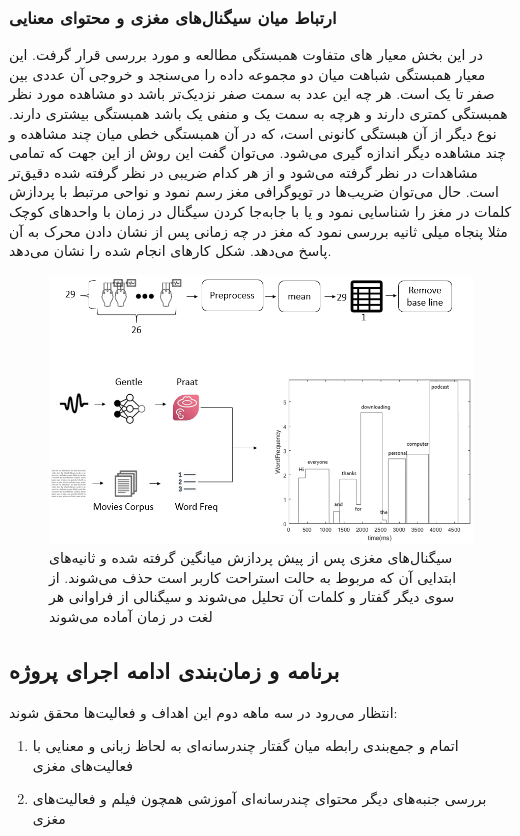 \subsubsection{ارتباط میان سیگنال‌های مغزی و محتوای معنایی}
در این بخش معیار های متفاوت همبستگی
مطالعه و مورد بررسی قرار گرفت. این معیار همبستگی شباهت میان دو مجموعه داده را می‌سنجد و خروجی آن عددی بین صفر تا یک است. هر چه این عدد به سمت صفر نزدیک‌تر باشد دو مشاهده مورد نظر همبستگی کمتری دارند و هرچه به سمت یک و منفی یک باشد همبستگی بیشتری دارند.
\newline
نوع دیگر از آن هبستگی کانونی
است، که در آن همبستگی خطی میان چند مشاهده و چند مشاهده دیگر اندازه گیری می‌شود. می‌توان گفت این روش از این جهت که تمامی مشاهدات در نظر گرفته می‌شود و از هر کدام ضریبی در نظر گرفته شده دقیق‌تر است.
حال می‌توان ضریب‌ها در توپوگرافی مغز رسم نمود و نواحی مرتبط با پردازش کلمات در مغز را شناسایی نمود و یا با جابه‌جا کردن سیگنال در زمان با واحدهای کوچک مثلا پنجاه میلی ثانیه بررسی نمود که مغز در چه زمانی پس از نشان دادن محرک به آن پاسخ می‌دهد.
شکل 
کارهای انجام شده را نشان می‌دهد.
\begin{figure}[h]
	\centering
	\includegraphics[width=0.8\linewidth]{figures/procedure}
	\caption[رویه‌ کار‌های انجام شده]{سیگنال‌های مغزی پس از پیش پردازش میانگین گرفته شده و ثانیه‌های ابتدایی آن که مربوط به حالت استراحت کاربر است حذف می‌شوند. از سوی دیگر گفتار و کلمات آن تحلیل می‌شوند و سیگنالی از فراوانی هر لغت در زمان آماده می‌شوند }
	\label{fig:procedure}
\end{figure}

\subsection{برنامه و زمان‌بندی ادامه اجرای پروژه}
انتظار می‌رود در سه ماهه دوم این اهداف و فعالیت‌ها محقق شوند:
\begin{enumerate}
	\item اتمام و جمع‌بندی رابطه میان گفتار چندرسانه‌ای به لحاظ زبانی و معنایی با فعالیت‌های مغزی
	\item بررسی جنبه‌های دیگر محتوای چندرسانه‌ای آموزشی همچون فیلم و فعالیت‌های مغزی
\end{enumerate}